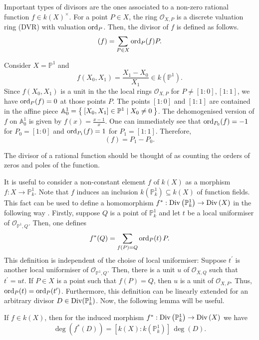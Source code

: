 Important types of divisors are the ones associated to a non-zero rational
function $f\in k(X)^{\times}$. For a point $P\in X$, the ring
$\mathscr{O}_{X,P}$ is a discrete valuation ring (DVR) with valuation
$\operatorname{ord}_{P}$. Then, the divisor of $f$ is defined as follows.
\[
  (f) = \sum_{P\in X}\operatorname{ord}_{P}(f)P.
\]
\begin{ex}
  Consider $X=\mathbb{P}^{1}$ and
  \[f(X_{0}, X_{1})=\frac{X_{1}-X_{0}}{X_{1}}\in k(\mathbb{P}^{1}).\]
  Since $f(X_{0}, X_{1})$ is a unit in the the local rings
  $\mathscr{O}_{X,P}$ for $P\neq [1:0], [1:1]$, we have $\operatorname{ord}_{P}(f)=0$
  at those points $P$. The points $[1:0]$ and $[1:1]$ are contained in the
  affine piece $\mathbb{A}_{0}^{1}=\Set{[X_{0},X_{1}]\in\mathbb{P}^{1}\mid
    X_{0}\neq 0}$. The dehomogenised version of $f$ on $\mathbb{A}_{0}^{1}$ is
  given by $f(x)=\frac{x-1}x$. One can immediately see that
  $\operatorname{ord}_{P_{0}}(f)=-1$ for $P_{0}=[1:0]$ and $\operatorname{ord}_{P_{1}}(f)=1$ for
  $P_{1}=[1:1]$. Therefore,
  \[(f)=P_{1}-P_{0}.\]
\end{ex}
\begin{rem}
  The divisor of a rational function should be thought of as counting the
  orders of zeros and poles of the function.
\end{rem}
It is useful to consider a non-constant element $f$ of $k(X)$ as a morphism
$f:X\to\mathbb{P}^{1}_{k}$. Note that $f$ induces an inclusion
$k\left(\mathbb{P}^{1}_{k}\right)\subseteq k\left(X\right)$ of function
fields. This fact can be used to define a homomorphism
$f^{\ast}:\operatorname{Div}\left(\mathbb{P}^{1}_{k}\right)\to\operatorname{Div}\left(X\right)$ in the
following way \cite{hartshorne}. Firstly, suppose $Q$ is a point of
$\mathbb{P}^{1}_{k}$ and let $t$ be a local uniformiser of
$\mathscr{O}_{\mathbb{P}^{1},Q}$. Then, one defines
\[
  f^{\ast}(Q)=\sum_{f(P)=Q}\operatorname{ord}_{P}(t)\,P.
\]
This definition is independent of the choise of local uniformiser: Suppose
$t^{\prime}$ is another local uniformiser of $\mathscr{O}_{\mathbb{P}^{1},Q}$.
Then, there is a unit $u$ of $\mathscr{O}_{X,Q}$ such that $t^{\prime}=ut$. If
$P\in X$ is a point such that $f(P)=Q$, then $u$ is a unit of
$\mathscr{O}_{X,P}$. Thus, $\operatorname{ord}_{P}(t)=\operatorname{ord}_{P}(t^{\prime})$. Furthermore, this
definition can be linearly extended for an arbitrary divisor
$D\in\operatorname{Div}(\mathbb{P}^{1}_{k})$. Now, the following lemma will be useful.
\begin{lemm}\label{lemm:deg_of_induced}
  If $f\in k(X)$, then for the induced morphism $f^{\ast}:\operatorname{Div}\left(
    \mathbb{P}^{1}_{k}\right)\to\operatorname{Div}\left(X\right)$ we have
  \[
    \deg\left(f^{\ast}(D)\right)=[k(X):k(\mathbb{P}^{1}_{k})]\,\deg(D).
  \]
\end{lemm}
